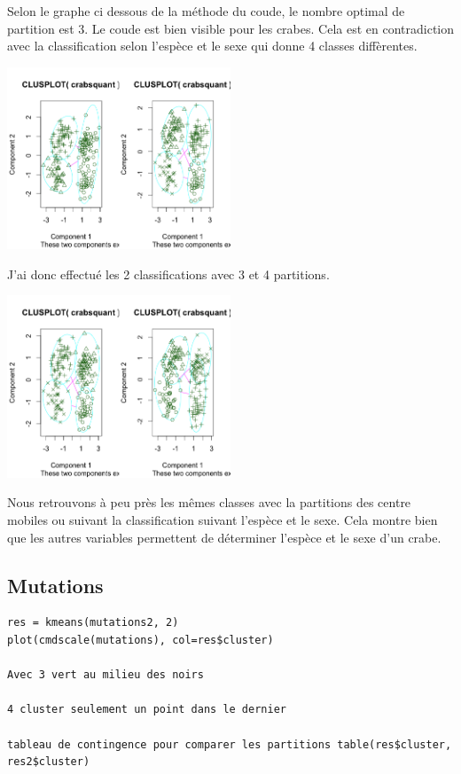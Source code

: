 \documentclass{article}\usepackage[]{graphicx}\usepackage[]{color}
\begin{document}
Selon le graphe ci dessous de la méthode du coude, le nombre optimal de partition est 3. Le coude est bien visible pour les crabes. Cela est en contradiction avec la classification selon l'espèce et le sexe qui donne 4 classes diffèrentes.  


\includegraphics[width=0.5\textwidth]{ex2_crab_3.png}

J'ai donc effectué les 2 classifications avec 3 et 4 partitions. 

\includegraphics[width=0.5\textwidth]{ex2_crab_4.png}

Nous retrouvons à peu près les mêmes classes avec la partitions des centre mobiles ou suivant la classification suivant l'espèce et le sexe. Cela montre bien que les autres variables permettent de déterminer l'espèce et le sexe d'un crabe. 



\subsection*{Mutations}
\begin{verbatim}
res = kmeans(mutations2, 2)
plot(cmdscale(mutations), col=res$cluster)

Avec 3 vert au milieu des noirs 

4 cluster seulement un point dans le dernier

tableau de contingence pour comparer les partitions table(res$cluster, res2$cluster)
\end{verbatim}
\end{document}
